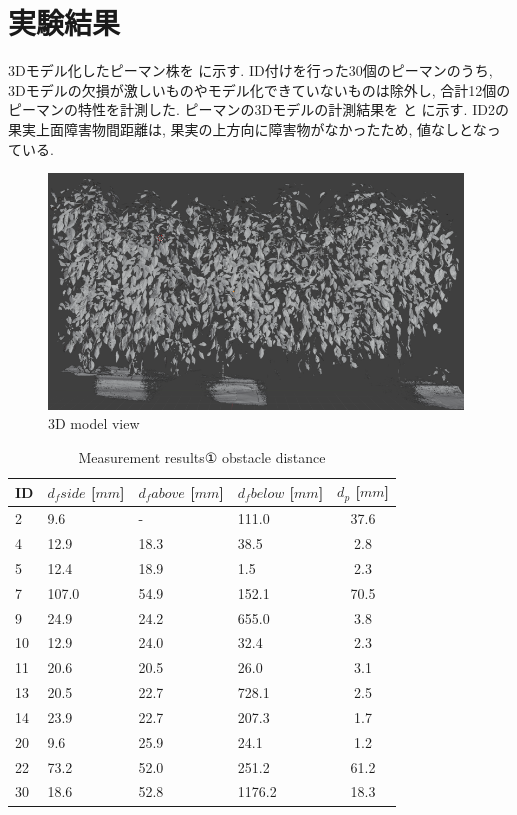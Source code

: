 \section{実験結果}
3Dモデル化したピーマン株を に示す.
ID付けを行った30個のピーマンのうち, 3Dモデルの欠損が激しいものやモデル化できていないものは除外し, 合計12個のピーマンの特性を計測した.
ピーマンの3Dモデルの計測結果を  と  に示す.
ID2の果実上面障害物間距離は, 果実の上方向に障害物がなかったため, 値なしとなっている.


\vspace{5mm}
\begin{figure}[H]
     \centering
     \includegraphics[width=110mm]{images/png/plant3d.png}
     \caption{3D model view}
     \label{Fig:plant3d}
   \end{figure}

\begin{table}[H]
  \begin{center}
    \begin{tabular}{l|p{30mm}p{30mm}p{30mm}c}
      ID & $d_fside$ [$mm$]& $d_fabove$ [$mm$]& $d_fbelow$ [$mm$]& $d_p$ [$mm$]\\ \hline\hline
      2 & 9.6 & - & 111.0 & 37.6\\
      4 & 12.9 & 18.3 & 38.5 & 2.8 \\
      5 & 12.4 & 18.9 & 1.5 & 2.3 \\
      7 & 107.0 & 54.9 & 152.1 & 70.5\\
      9 & 24.9 & 24.2 & 655.0 & 3.8\\
      10 & 12.9 & 24.0 & 32.4 & 2.3\\
      11 & 20.6 & 20.5 & 26.0 & 3.1\\
      13 & 20.5 & 22.7 & 728.1 & 2.5\\
      14 & 23.9 & 22.7 & 207.3 & 1.7\\
      20 & 9.6 & 25.9 & 24.1 & 1.2\\
      22 & 73.2 & 52.0 & 251.2 & 61.2\\
      30 & 18.6 & 52.8 & 1176.2 & 18.3\\
    \end{tabular}
    \caption{Measurement results① obstacle distance}
    \label{Tab:measurementresults1}
  \end{center}
\end{table}

